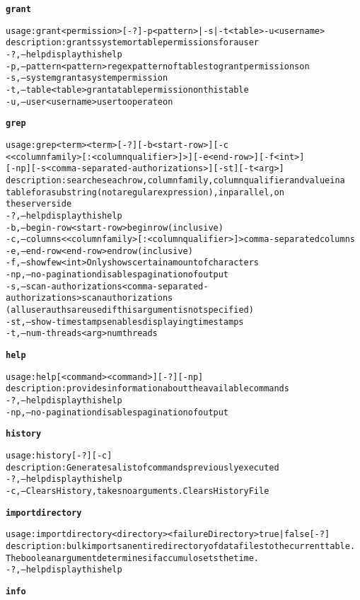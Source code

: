 \begin{alltt}
\textbf{grant}

    usage: grant <permission> [-?] -p <pattern> | -s | -t <table>  -u <username>
    description: grants system or table permissions for a user
      -?,--help  display this help
      -p,--pattern <pattern>  regex pattern of tables to grant permissions on
      -s,--system  grant a system permission
      -t,--table <table>  grant a table permission on this table
      -u,--user <username>	user to operate on

\textbf{grep}

    usage: grep <term>{ <term>} [-?] [-b <start-row>] [-c
    	      <{<columnfamily>[:<columnqualifier>]}>] [-e <end-row>] [-f <int>]
    	      [-np] [-s <comma-separated-authorizations>] [-st] [-t <arg>]
    description: searches each row, column family, column qualifier and value in a
    	      table for a substring (not a regular expression), in parallel, on
    	      the server side
      -?,--help  display this help
      -b,--begin-row <start-row>  begin row (inclusive)
      -c,--columns <{<columnfamily>[:<columnqualifier>]}>  comma-separated columns
      -e,--end-row <end-row>  end row (inclusive)
      -f,--show few <int>  Only shows certain amount of characters
      -np,--no-pagination  disables pagination of output
      -s,--scan-authorizations <comma-separated-authorizations>  scan authorizations
    	      (all user auths are used if this argument is not specified)
      -st,--show-timestamps  enables displaying timestamps
      -t,--num-threads <arg>  num threads

\textbf{help}

    usage: help [ <command>{ <command>} ] [-?] [-np]
    description: provides information about the available commands
      -?,--help  display this help
      -np,--no-pagination  disables pagination of output

\textbf{history}

    usage: history [-?] [-c]
    description: Generates a list of commands previously executed
      -?,--help  display this help
      -c,--Clears History, takes no arguments.  Clears History File

\textbf{importdirectory}

    usage: importdirectory <directory> <failureDirectory> true|false [-?]
    description: bulk imports an entire directory of data files to the current table.
    	       The boolean argument determines if accumulo sets the time.
      -?,--help  display this help

\textbf{info}


\end{alltt}
